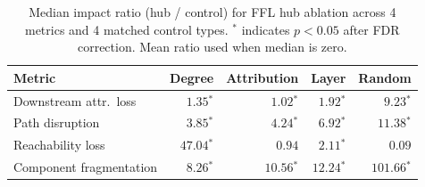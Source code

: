 \begin{table}[t]
\centering
\caption{Median impact ratio (hub / control) for FFL hub ablation across 4 metrics and 4 matched control types. $^{*}$ indicates $p<0.05$ after FDR correction. Mean ratio used when median is zero.}
\label{table:ablation}
\begin{tabular}{lrrrr}
\toprule
Metric & Degree & Attribution & Layer & Random \\
\midrule
    Downstream attr.\ loss         & $1.35$$^{*}$ & $1.02$$^{*}$ & $1.92$$^{*}$ & $9.23$$^{*}$ \\
    Path disruption                & $3.85$$^{*}$ & $4.24$$^{*}$ & $6.92$$^{*}$ & $11.38$$^{*}$ \\
    Reachability loss              & $47.04$$^{*}$ & $0.94$ & $2.11$$^{*}$ & $0.09$ \\
    Component fragmentation        & $8.26$$^{*}$ & $10.56$$^{*}$ & $12.24$$^{*}$ & $101.66$$^{*}$ \\
\bottomrule
\end{tabular}
\end{table}